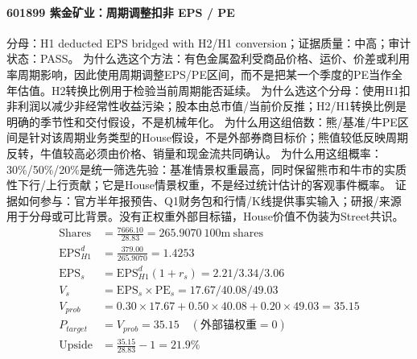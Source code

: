 \paragraph{601899 紫金矿业：周期调整扣非 EPS / PE}
分母：H1 deducted EPS bridged with H2/H1 conversion；证据质量：中高；审计状态：PASS。
为什么选这个方法：有色金属盈利受商品价格、运价、价差或利用率周期影响，因此使用周期调整EPS/PE区间，而不是把某一个季度的PE当作全年估值。H2转换比例用于检验当前周期能否延续。
为什么选这个分母：使用H1扣非利润以减少非经常性收益污染；股本由总市值/当前价反推；H2/H1转换比例是明确的季节性和交付假设，不是机械年化。
为什么用这组倍数：熊/基准/牛PE区间是针对该周期业务类型的House假设，不是外部券商目标价；熊值较低反映周期反转，牛值较高必须由价格、销量和现金流共同确认。
为什么用这组概率：30\%/50\%/20\%是统一筛选先验：基准情景权重最高，同时保留熊市和牛市的实质性下行/上行贡献；它是House情景权重，不是经过统计估计的客观事件概率。
证据如何参与：官方半年报预告、Q1财务包和行情/K线提供事实输入；研报/来源用于分母或可比背景。没有正权重外部目标锚，House价值不伪装为Street共识。
\begin{align*}
\mathrm{Shares} &= \frac{7666.10}{28.83}=265.9070\ \mathrm{100m\ shares}\\
\mathrm{EPS}_{H1}^d &= \frac{379.00}{265.9070}=1.4253\\
\mathrm{EPS}_s &= \mathrm{EPS}_{H1}^d(1+r_s)=2.21/3.34/3.06\\
V_s &= \mathrm{EPS}_s\times \mathrm{PE}_s=17.67/40.08/49.03\\
V_{prob} &= 0.30\times 17.67+0.50\times 40.08+0.20\times 49.03=35.15\\
P_{target} &= V_{prob}=35.15\quad(\text{外部锚权重}=0)\\
\mathrm{Upside} &= \frac{35.15}{28.83}-1=21.9\%\\
\end{align*}

